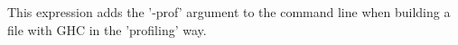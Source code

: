 \noindent This expression adds the \lst'-prof' argument to the command line when
building a file with GHC in the \lst'profiling' way.

\newcommand{\itab}[1]{\hspace{0em}\rlap{#1}}
\newcommand{\tab}[1]{\hspace{.1\textwidth}\rlap{#1}}
\newcommand{\ctab}[1]{\hspace{.031\textwidth}\rlap{#1}}
\newcommand{\ptab}[1]{\hspace{.074\textwidth}\rlap{#1}}
\newcommand{\cotab}[1]{\hspace{.064\textwidth}\rlap{#1}}
\newcommand{\ttab}[1]{\hspace{.058\textwidth}\rlap{#1}}
\newcommand{\tytab}[1]{\hspace{.06\textwidth}\rlap{#1}}
\newcommand{\atab}[1]{\hspace{.102\textwidth}\rlap{#1}}

